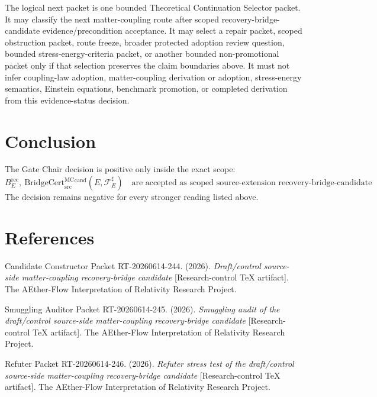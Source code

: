 \documentclass[11pt]{article}
\newcommand{\BridgeCert}{\mathrm{BridgeCert}_{\mathrm{src}}^{\mathrm{MC}}}
\newcommand{\BErec}{B_E^{\mathrm{rec}}}
\begin{document}
The logical next packet is one bounded Theoretical Continuation Selector
packet. It may classify the next matter-coupling route after scoped
recovery-bridge-candidate evidence/precondition acceptance. It may select a
repair packet, scoped obstruction packet, route freeze, broader protected
adoption review question, bounded stress-energy-criteria packet, or another
bounded non-promotional packet only if that selection preserves the claim
boundaries above. It must not infer coupling-law adoption, matter-coupling
derivation or adoption, stress-energy semantics, Einstein equations,
benchmark promotion, or completed derivation from this evidence-status
decision.

\section{Conclusion}

The Gate Chair decision is positive only inside the exact scope:
\[
\BErec,\ \BridgeCert^{\mathrm{cand}}(E,\mathcal{F}_E^\sharp)
\quad\text{are accepted as scoped source-extension recovery-bridge-candidate evidence/precondition.}
\]
The decision remains negative for every stronger reading listed above.

\section{References}

Candidate Constructor Packet RT-20260614-244. (2026). \textit{Draft/control
source-side matter-coupling recovery-bridge candidate} [Research-control TeX
artifact]. The AEther-Flow Interpretation of Relativity Research Project.

Smuggling Auditor Packet RT-20260614-245. (2026). \textit{Smuggling audit of
the draft/control source-side matter-coupling recovery-bridge candidate}
[Research-control TeX artifact]. The AEther-Flow Interpretation of Relativity
Research Project.

Refuter Packet RT-20260614-246. (2026). \textit{Refuter stress test of the
draft/control source-side matter-coupling recovery-bridge candidate}
[Research-control TeX artifact]. The AEther-Flow Interpretation of Relativity
Research Project.
\end{document}
